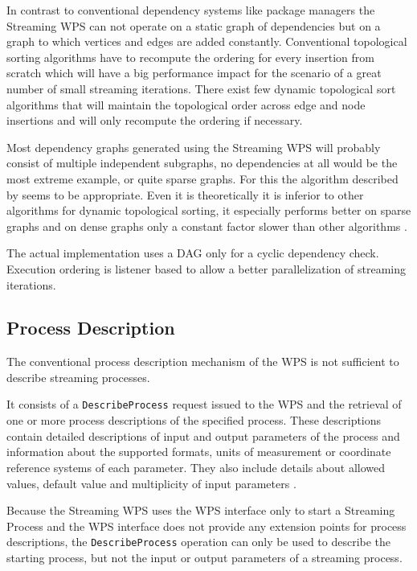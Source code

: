 		In contrast to conventional dependency systems like package managers the Streaming \ac{WPS} can not operate on a static graph of dependencies but on a graph to which vertices and edges are added constantly. Conventional topological sorting algorithms have to recompute the ordering for every insertion from scratch which will have a big performance impact for the scenario of a great number of small streaming iterations. There exist few dynamic topological sort algorithms that will maintain the topological order across edge and node insertions and will only recompute the ordering if necessary.

		Most dependency graphs generated using the Streaming \ac{WPS} will probably consist of multiple independent subgraphs, no dependencies at all would be the most extreme example, or quite sparse graphs. For this the algorithm described by \citet{pearce2007dynamic} seems to be appropriate. Even it is theoretically it is inferior to other algorithms for dynamic topological sorting, it especially performs better on sparse graphs and on dense graphs only a constant factor slower than other algorithms \citep{pearce2007dynamic}.

		The actual implementation uses a \ac{DAG} only for a cyclic dependency check. Execution ordering is listener based to allow a better parallelization of streaming iterations.

	\subsection{Process Description}
		The conventional process description mechanism of the \ac{WPS} is not sufficient to describe streaming processes.

		It consists of a \texttt{DescribeProcess} request issued to the \ac{WPS} and the retrieval of one or more process descriptions of the specified process. These descriptions contain detailed descriptions of input and output parameters of the process and information about the supported formats, units of measurement or coordinate reference systems of each parameter. They also include details about allowed values, default value and multiplicity of input parameters \citep{ogc:wps}.

		Because the Streaming \ac{WPS} uses the \ac{WPS} interface only to start a Streaming Process and the \ac{WPS} interface does not provide any extension points for process descriptions, the \texttt{DescribeProcess} operation can only be used to describe the starting process, but not the input or output parameters of a streaming process.

